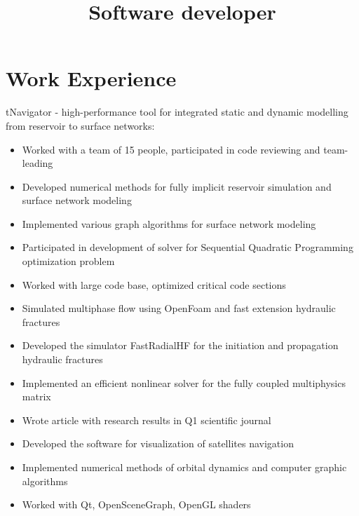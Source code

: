 \documentclass[10pt,a4paper]{moderncv}
\title{Software developer}
\begin{document}
\maketitle

\section{Work Experience}

{tNavigator - high-performance tool for integrated static and dynamic modelling from reservoir to surface networks:
  \begin{itemize}
  \item Worked with a team of 15 people, participated in code reviewing and team-leading
  \item Developed numerical methods for fully implicit reservoir simulation and surface network modeling
  \item Implemented various graph algorithms for surface network modeling
  \item Participated in development of solver for Sequential Quadratic Programming optimization problem
  \item Worked with large code base, optimized critical code sections 
  \end{itemize}
}

{
\begin{itemize}
 \item Simulated multiphase flow using OpenFoam and fast extension hydraulic fractures
 \item Developed the simulator FastRadialHF for the initiation and propagation hydraulic fractures
 \item Implemented an efficient nonlinear solver for the fully coupled multiphysics matrix
 \item Wrote article with research results in Q1 scientific journal 
\end{itemize}
}

{
\begin{itemize}
 \item Developed the software for visualization of satellites navigation
 \item Implemented numerical methods of orbital dynamics and computer graphic algorithms
 \item Worked with Qt, OpenSceneGraph, OpenGL shaders
\end{itemize}
}
\end{document}
